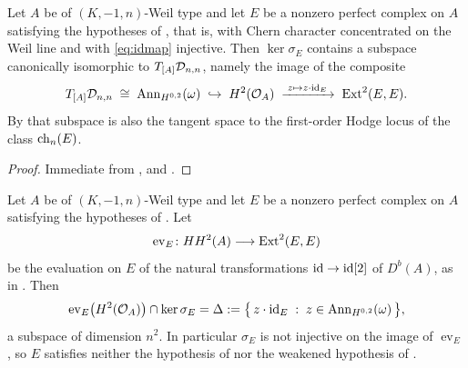 \begin{corollary}
\label{cor:kernelfamily}
Let $A$ be of $(K,-1,n)$-Weil type and let $E$ be a nonzero perfect complex on
$A$ satisfying the hypotheses of , that is, with Chern
character concentrated on the Weil line and with \eqref{eq:idmap} injective.
Then $\ker\sigma_{E}$ contains a subspace canonically isomorphic to
$T_{[A]}\mathcal{D}_{n,n}$, namely the image of the composite
\[
  T_{[A]}\mathcal{D}_{n,n}\;\cong\;\operatorname{Ann}_{H^{0,2}}(\omega)
  \;\hookrightarrow\;H^{2}(\mathcal{O}_{A})\;\xrightarrow{\;z\mapsto z\cdot\operatorname{id}_{E}\;}\;
  \operatorname{Ext}^{2}(E,E).
\]
By  that subspace is also the tangent space to the
first-order Hodge locus of the class $\operatorname{ch}_{n}(E)$.
\end{corollary}

\begin{proof}
Immediate from ,  and
.
\end{proof}

\begin{theorem}\label{thm:weakfails}
Let $A$ be of $(K,-1,n)$-Weil type and let $E$ be a nonzero perfect complex on
$A$ satisfying the hypotheses of . Let
\[
  \operatorname{ev}_{E}\colon HH^{2}(A)\longrightarrow\operatorname{Ext}^{2}(E,E)
\]
be the evaluation on $E$ of the natural transformations $\operatorname{id}\to\operatorname{id}[2]$ of
$D^{b}(A)$, as in \cite[Section 11.4]{Mar25b}. Then
\[
  \operatorname{ev}_{E}\bigl(H^{2}(\mathcal{O}_{A})\bigr)\cap\ker\sigma_{E}
  =\Delta:=\bigl\{\,z\cdot\operatorname{id}_{E}\;:\;z\in\operatorname{Ann}_{H^{0,2}}(\omega)\,\bigr\},
\]
a subspace of dimension $n^{2}$. In particular $\sigma_{E}$ is not injective
on the image of $\operatorname{ev}_{E}$, so $E$ satisfies neither the
hypothesis of \cite[Lemma 11.3]{Mar25b} nor the weakened hypothesis of
\cite[Question 11.4]{Mar25b}.
\end{theorem}

